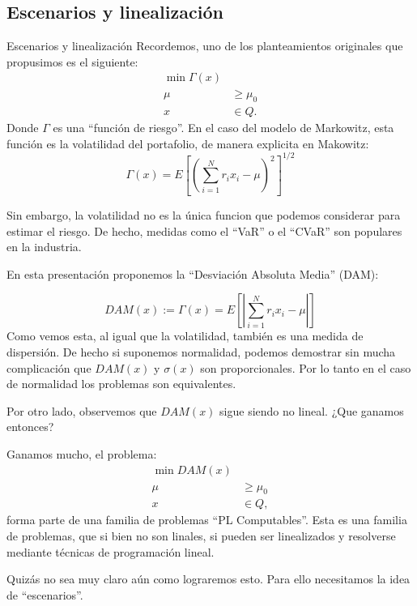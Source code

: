 \documentclass{beamer}
\begin{document}
    \subsection[Escenarios y linealización]{Escenarios y linealización}
    \begin{frame}{Escenarios y linealización}
        Recordemos, uno de los planteamientos originales que propusimos es el siguiente:
        \begin{align*}
            \min \Gamma(x)&\\
            \mu&\geq \mu_0\\
            x& \in Q.
        \end{align*}
        Donde $\Gamma$ es una ``función de riesgo''. En el caso del modelo de Markowitz, esta función es la volatilidad del portafolio, de manera explicita en Makowitz:
        $$
        \Gamma(x) = E\left[\left(\sum_{i=1}^{N}r_ix_i-\mu\right)^2\right]^{1/2}
        $$
    \end{frame}
    \begin{frame}
        Sin embargo, la volatilidad no es la única funcion que podemos considerar para estimar el riesgo. De hecho, medidas como el ``VaR'' o el ``CVaR'' son populares en la industria.

        En esta presentación proponemos la ``Desviación Absoluta Media'' (DAM):

        $$
        DAM(x):=\Gamma(x) = E\left[\left\vert\sum_{i=1}^{N} r_ix_i-\mu\right\vert\right]
        $$
        Como vemos esta, al igual que la volatilidad, también es una medida de dispersión. De hecho si suponemos normalidad, podemos demostrar sin mucha complicación que $DAM(x)$ y $\sigma(x)$ son proporcionales. Por lo tanto en el caso de normalidad los problemas son equivalentes.
        \par\medskip
        Por otro lado, observemos que $DAM(x)$ sigue siendo no lineal. ¿Que ganamos entonces?
    \end{frame}
    \begin{frame}
        Ganamos mucho, el problema:
        \begin{align*}
            \min DAM(x)&\\
            \mu&\geq \mu_0\\
            x& \in Q,
        \end{align*}
        forma parte de una familia de problemas ``PL Computables''. Esta es una familia de problemas, que si bien no son linales, si pueden ser linealizados y resolverse mediante técnicas de programación lineal.
        \par\medskip
        Quizás no sea muy claro aún como lograremos esto. Para ello necesitamos la idea de ``escenarios''.
    \end{frame}
\end{document}

